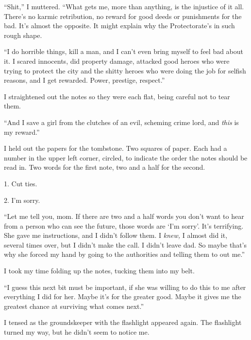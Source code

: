 ``Shit,'' I muttered.  ``What gets me, more than anything, is the injustice of it all.  There's no karmic retribution, no reward for good deeds or punishments for the bad.  It's almost the opposite.  It might explain why the Protectorate's in such rough shape.



``I do horrible things, kill a man, and I can't even bring myself to feel bad about it.  I scared innocents, did property damage, attacked good heroes who were trying to protect the city and the shitty heroes who were doing the job for selfish reasons, and I get rewarded.  Power, prestige, respect.''



I straightened out the notes so they were each flat, being careful not to tear them.



``And I save a girl from the clutches of an evil, scheming crime lord, and \emph{this} is my reward.''



I held out the papers for the tombstone.  Two squares of paper.  Each had a number in the upper left corner, circled, to indicate the order the notes should be read in.  Two words for the first note, two and a half for the second.



1.  Cut ties.



2.  I'm sorry.



``Let me tell you, mom.  If there are two and a half words you don't want to hear from a person who can see the future, those words are `I'm sorry'.  It's terrifying.  She gave me instructions, and I didn't follow them.  I \emph{knew, }I almost did it, several times over, but I didn't make the call.  I didn't leave dad.  So maybe that's why she forced my hand by going to the authorities and telling them to out me.''



I took my time folding up the notes, tucking them into my belt.



``I guess this next bit must be important, if she was willing to do this to me after everything I did for her.  Maybe it's for the greater good.  Maybe it gives me the greatest chance at surviving what comes next.''



I tensed as the groundskeeper with the flashlight appeared again.  The flashlight turned my way, but he didn't seem to notice me.



